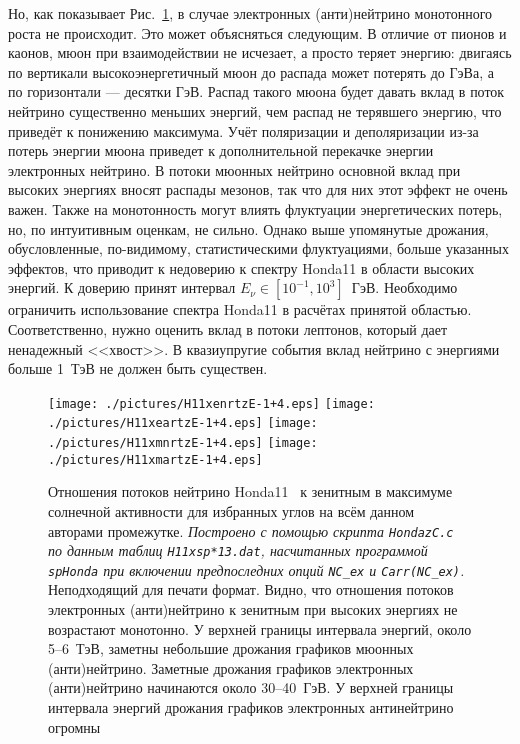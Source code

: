 Но, как показывает Рис.~\ref{Honda11maxrtzE-1+4}, в случае электронных (анти)нейтрино монотонного роста не происходит. \textsf{Это может объясняться следующим. В отличие от пионов и каонов, мюон при взаимодействии не исчезает, а просто теряет энергию: двигаясь по вертикали высокоэнергетичный мюон до распада может потерять до ГэВа, а по горизонтали --- десятки ГэВ. Распад такого мюона будет давать вклад в поток нейтрино существенно меньших энергий, чем распад не терявшего энергию, что приведёт к понижению максимума. {\color{brown}Учёт поляризации и деполяризации из-за потерь энергии мюона приведет к дополнительной перекачке энергии электронных нейтрино.} В потоки мюонных нейтрино основной вклад при высоких энергиях вносят распады мезонов, так что для них этот эффект не очень важен. Также на монотонность могут влиять флуктуации энергетических потерь, но, по интуитивным оценкам, не сильно.} Однако выше упомянутые дрожания, обусловленные, по-видимому, статистическими флуктуациями, {\color{red}больше} указанных эффектов, что приводит к недоверию к спектру Honda11 в области высоких энергий. {\color{blue}К доверию принят интервал $E_{\nu}\in[10^{-1},10^{3}]$~ГэВ.} {\color{MYgreen}Необходимо ограничить использование спектра Honda11 в расчётах принятой областью. Соответственно, нужно оценить вклад в потоки лептонов, который дает ненадежный <<хвост>>.} В квазиупругие события вклад нейтрино с энергиями больше 1~ТэВ не должен быть существен.
\begin{figure}[!ht]
\texttt{[image: ./pictures/H11xenrtzE-1+4.eps]}
\texttt{[image: ./pictures/H11xeartzE-1+4.eps]}
\texttt{[image: ./pictures/H11xmnrtzE-1+4.eps]}
\texttt{[image: ./pictures/H11xmartzE-1+4.eps]}
\caption{Отношения потоков нейтрино Honda11~\cite{Honda:2011nf} к зенитным в максимуме солнечной активности для избранных углов на всём данном авторами промежутке. \textit{Построено с помощью скрипта \texttt{HondazC.c} по данным таблиц \texttt{H11xsp*13.dat}, насчитанных программой \texttt{spHonda} при включении предпоследних опций \texttt{NC\_ex} и \texttt{Carr(NC\_ex)}.} {\color{magenta}Неподходящий для печати формат.} Видно, что отношения потоков электронных (анти)нейтрино к зенитным при высоких энергиях не возрастают монотонно. У верхней границы интервала энергий, около 5--6~ТэВ, заметны небольшие дрожания графиков мюонных (анти)нейтрино. Заметные дрожания графиков электронных (анти)нейтрино начинаются около 30--40~ГэВ. У верхней границы интервала энергий дрожания графиков электронных антинейтрино огромны}
\label{Honda11maxrtzE-1+4}
\end{figure}

